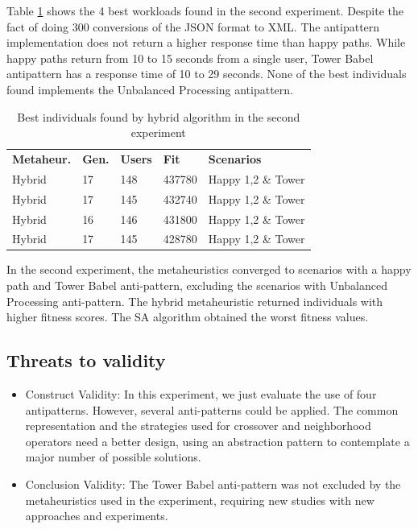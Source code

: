 \documentclass[espaco=umemeio,chapter=TITLE,twoside,openright]{abnt}
\begin{document}
Table \ref{tab:bestindividuals2} shows the 4 best workloads found in the second experiment. Despite the fact of doing 300 conversions of the JSON format to XML. The antipattern implementation does not return a higher response time than happy paths. While happy paths return from 10 to 15 seconds from a single user, Tower Babel antipattern has a response time of 10 to 29 seconds. None of the best individuals found implements the Unbalanced Processing antipattern.


\begin{table}[h]
\centering
\caption{Best individuals found by hybrid algorithm in the second experiment}
\label{tab:bestindividuals2}
\begin{tabular}{lllll}
\rowcolor[HTML]{FFCCC9}
\textbf{Metaheur.} & \textbf{Gen.} & \textbf{Users} & \textbf{Fit} & \textbf{Scenarios}  \\
\multicolumn{1}{l}{Hybrid} & \multicolumn{1}{l}{17} & \multicolumn{1}{l}{148} & \multicolumn{1}{l}{437780} & \multicolumn{1}{l}{Happy 1,2 \& Tower}  \\
\multicolumn{1}{l}{Hybrid} & \multicolumn{1}{l}{17} & \multicolumn{1}{l}{145} & \multicolumn{1}{l}{432740} & \multicolumn{1}{l}{Happy 1,2 \& Tower}  \\
\multicolumn{1}{l}{Hybrid} & \multicolumn{1}{l}{16} & \multicolumn{1}{l}{146} & \multicolumn{1}{l}{431800} & \multicolumn{1}{l}{Happy 1,2 \& Tower} \\
\multicolumn{1}{l}{Hybrid} & \multicolumn{1}{l}{17} & \multicolumn{1}{l}{145} & \multicolumn{1}{l}{428780} & \multicolumn{1}{l}{Happy 1,2 \& Tower}  \\
\end{tabular}
\end{table}

In the second experiment, the metaheuristics converged to scenarios with a happy path and Tower Babel anti-pattern, excluding the scenarios with Unbalanced Processing anti-pattern. The hybrid metaheuristic returned individuals with higher fitness scores. The SA algorithm obtained the worst fitness values.

\subsection{Threats to validity}
\begin{itemize}
\item Construct Validity:
In this experiment, we just evaluate the use of four antipatterns. However, several anti-patterns could be applied.  The common representation and the strategies used for crossover and neighborhood operators need a better design, using an abstraction pattern to contemplate a major number of possible solutions.
\item Conclusion Validity:
The Tower Babel anti-pattern was not excluded by the metaheuristics used in the experiment, requiring new studies with new approaches and experiments.
\end{itemize}
\end{document}
